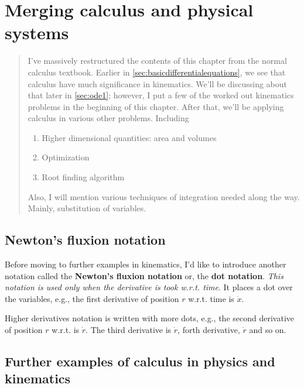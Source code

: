 \chapter{Merging calculus and physical systems}
\label{sec:significanceofcalculus}

\begin{abstract}
    I've massively restructured the contents of this chapter from the normal calculus textbook. Earlier in \cref{sec:basicdifferentialequations}, we see that calculus have much significance in kinematics. We'll be discussing about that later in \cref{sec:ode1}; however, I put a few of the worked out kinematics problems in the beginning of this chapter. After that, we'll be applying calculus in various other problems. Including
    \begin{enumerate}[noitemsep]
        \item Higher dimensional quantities: area and volumes
        \item Optimization
        \item Root finding algorithm
    \end{enumerate}

    Also, I will mention various techniques of integration needed along the way. Mainly, substitution of variables.

\end{abstract}

\section{Newton's fluxion notation}
\label{sec:newtons_fluxion_notation}

Before moving to further examples in kinematics, I'd like to introduce another notation called the \textbf{Newton's fluxion notation} or, the \textbf{dot notation}. \emph{This notation is used only when the derivative is took w.r.t. time}. It places a dot over the variables, e.g., the first derivative of position $r$ w.r.t. time is $\dot{x}$.

Higher derivatives notation is written with more dots, e.g., the second derivative of position $r$ w.r.t. is $\dot{r}$. The third derivative is $\dot{r}$, forth derivative, $\dot{r}$ and so on.

\section{Further examples of calculus in physics and kinematics}

